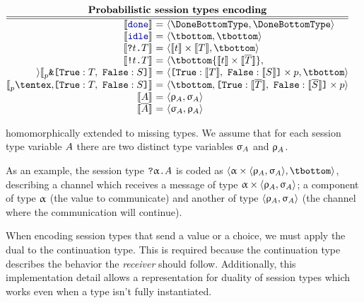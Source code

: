 \begin{center}
$\displaystyle
  \begin{array}{@{}c@{}}
    \textbf{Probabilistic session types encoding} \\
    \hline
    \hline
    \begin{array}[t]{@{}r@{~}c@{~}l@{}}
      \encfun\Done
      & = &
      \tsession\DoneBottomType\DoneBottomType
      \\
      \encfun\Idle
      & = &
      \tsession\tbottom\tbottom
      \\
      \encfun{\In\Type\SessionType}
      & = &
      \tsession{\encfun\Type\tmul\encfun\SessionType}\tbottom
      \\
      \encfun{\Out\Type\SessionType}
      & = &
      \tsession\tbottom{\encfun\Type\tmul\encfun{\dual\SessionType}}
      \\
      \encfun{\BinaryPBranch[p]{\SessionTypeT}{\SessionTypeS}}
      & = &
      \tsession{\BinaryLabels{\encfun{\SessionTypeT}}{\encfun{\SessionTypeS}}\tmul p}\tbottom
      \\
      \encfun{\BinaryPChoice[p]{\SessionTypeT}{\SessionTypeS}}
      & = &
      \tsession{\tbottom}{\BinaryLabels{\encfun{\dual\SessionTypeT}}{\encfun{\dual\SessionTypeS}}\tmul p}
      \\
      \encfun\etvar
      & = &
      \tsession{\renc\etvar}{\senc\etvar}
      \\
      \encfun{\sdual\etvar}
      & = &
      \tsession{\senc\etvar}{\renc\etvar}
    \end{array}
  \end{array}
$
\end{center}

homomorphically extended to missing types. We assume that for each session type
variable $A$ there are two distinct type variables $\upsigma_{A}$ and
$\uprho_{A}$.

As an example, the session type ${\texttt{\upshape?}}{\upalpha}\texttt{\upshape.}A$ is coded as $\tsession{\tvar
\tmul \tsession{\renc\etvar}{\senc\etvar}}\tbottom$, describing a channel which
receives a message of type $\upalpha \times \langle\uprho_{A},\upsigma_{A}\rangle$; a
component of type $\upalpha$ (the value to communicate) and another of type
$\langle\uprho_{A},\upsigma_{A}\rangle$ (the channel where the communication will
continue).

When encoding session types that send a value or a choice, we must apply the
dual to the continuation type. This is required because the continuation type
describes the behavior the \emph{receiver} should follow. Additionally, this
implementation detail allows a representation for duality of session types which
works even when a type isn't fully instantiated.


